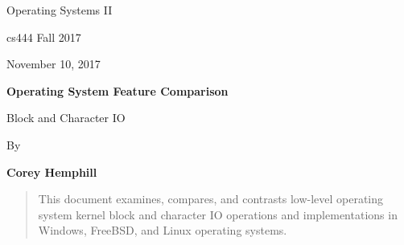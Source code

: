 \documentclass[letterpaper,10pt,draftclsnofoot,onecolumn]{IEEEtran}
\def \Author{Corey Hemphill}
\def \Title{Operating System Feature Comparison}
\def \Subtitle{Block and Character IO}
\def \Term{cs444 Fall 2017}
\def \DueDate{November 10, 2017}
\def \DocType{
	Operating Systems II
}
\begin{document}
\begin{titlepage}
    \begin{singlespace}
        \hfill  
        \par\vspace{.2in}
        \centering
        \scshape {
            \huge  \DocType \par
           	\huge \Term \par
            {\large \DueDate}\par
            \vspace{.5in}
            \textbf{\Huge \Title}\par
            {\large \Subtitle}\par
            \vspace{.5in}          
            {\large By }\par
           	\textbf{\Author}\par
            \vspace{5pt}
            }
            \vspace{120pt}
        
        \begin{abstract}
        This document examines, compares, and contrasts low-level operating system kernel block and character IO operations and implementations in Windows, FreeBSD, and Linux operating systems.
        \end{abstract}
        
    \end{singlespace}
\end{titlepage}
\newpage
\end{document}
